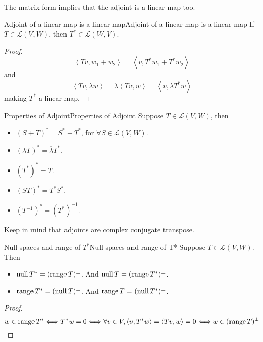 \documentclass[../main.tex]{subfiles}
\begin{document}
The matrix form implies that the adjoint is a linear map too.
\begin{theorem}{Adjoint of a linear map is a linear map}{Adjoint of a linear map is a linear map}
If $T\in \mathscr{L}(V,W)$, then $T^*\in \mathscr{L}(W,V)$.
\end{theorem}
\begin{proof}
\begin{equation*}
\left<Tv,w_1+w_2\right> = \left<v, T^*w_1+T^*w_2\right> 
\end{equation*}
and
\begin{equation*}
\left<Tv,\lambda w\right> = \overline{\lambda} \left<Tv,w\right> = \left<v,\lambda T^* w\right> 
\end{equation*}
making $T^*$ a linear map.
\end{proof}
\begin{proposition}{Properties of Adjoint}{Properties of Adjoint}
Suppose $T\in \mathscr{L}(V,W)$, then
\begin{itemize}
\item $(S+T)^*=S^*+T^*$, for $\forall S\in \mathscr{L}(V,W)$.
\item $(\lambda T)^* = \overline{\lambda}T^*$.
\item $(T^*)^*=T$.
\item $(ST)^*=T^*S^*$.
\item $(T ^{-1})^* = (T^*)^{-1}$.
\end{itemize}
\end{proposition}
\begin{remark}
Keep in mind that adjoints are complex conjugate transpose.
\end{remark}

\begin{theorem}{Null spaces and range of $T^*$}{Null spaces and range of T*}
Suppose $T\in \mathscr{L}(V,W)$. Then
\begin{itemize}
\item $\operatorname{null} T^* = (\operatorname{range} T)^{\perp}$. And $\operatorname{null} T = (\operatorname{range} T^*)^{\perp}$.
\item $\operatorname{range} T^* = (\operatorname{null} T)^{\perp}$. And $\operatorname{range} T = (\operatorname{null} T^*)^{\perp}$.
\end{itemize}
\end{theorem}
\begin{proof}
\begin{equation*}
w\in \operatorname{range} T^* \Longleftrightarrow T^*w=0 \Longleftrightarrow \forall v\in V,\left<v,T^*w \right> = \left<Tv,w\right>  =0 \Longleftrightarrow w\in (\operatorname{range} T)^{\perp}
\end{equation*}
\end{proof}
\end{document}
